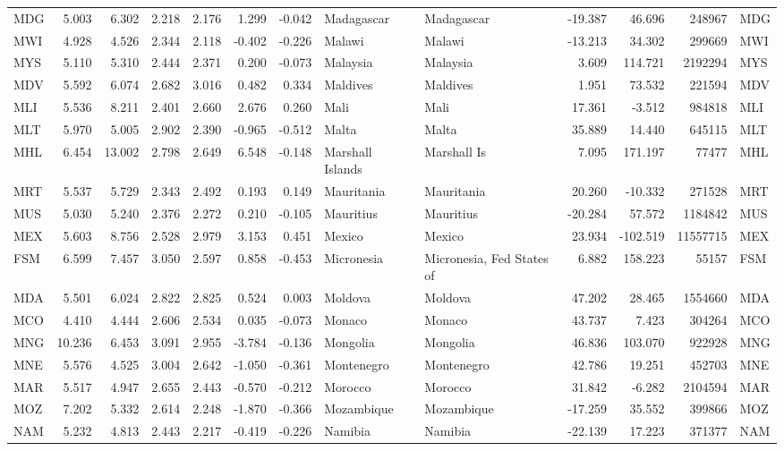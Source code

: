 \begin{tabular}{lrrrrrrllrrrl}
MDG & 5.003 & 6.302 & 2.218 & 2.176 & 1.299 & -0.042 & Madagascar & Madagascar & -19.387 & 46.696 & 248967 & MDG \\
MWI & 4.928 & 4.526 & 2.344 & 2.118 & -0.402 & -0.226 & Malawi & Malawi & -13.213 & 34.302 & 299669 & MWI \\
MYS & 5.110 & 5.310 & 2.444 & 2.371 & 0.200 & -0.073 & Malaysia & Malaysia & 3.609 & 114.721 & 2192294 & MYS \\
MDV & 5.592 & 6.074 & 2.682 & 3.016 & 0.482 & 0.334 & Maldives & Maldives & 1.951 & 73.532 & 221594 & MDV \\
MLI & 5.536 & 8.211 & 2.401 & 2.660 & 2.676 & 0.260 & Mali & Mali & 17.361 & -3.512 & 984818 & MLI \\
MLT & 5.970 & 5.005 & 2.902 & 2.390 & -0.965 & -0.512 & Malta & Malta & 35.889 & 14.440 & 645115 & MLT \\
MHL & 6.454 & 13.002 & 2.798 & 2.649 & 6.548 & -0.148 & Marshall Islands & Marshall Is & 7.095 & 171.197 & 77477 & MHL \\
MRT & 5.537 & 5.729 & 2.343 & 2.492 & 0.193 & 0.149 & Mauritania & Mauritania & 20.260 & -10.332 & 271528 & MRT \\
MUS & 5.030 & 5.240 & 2.376 & 2.272 & 0.210 & -0.105 & Mauritius & Mauritius & -20.284 & 57.572 & 1184842 & MUS \\
MEX & 5.603 & 8.756 & 2.528 & 2.979 & 3.153 & 0.451 & Mexico & Mexico & 23.934 & -102.519 & 11557715 & MEX \\
FSM & 6.599 & 7.457 & 3.050 & 2.597 & 0.858 & -0.453 & Micronesia & Micronesia, Fed States of & 6.882 & 158.223 & 55157 & FSM \\
MDA & 5.501 & 6.024 & 2.822 & 2.825 & 0.524 & 0.003 & Moldova & Moldova & 47.202 & 28.465 & 1554660 & MDA \\
MCO & 4.410 & 4.444 & 2.606 & 2.534 & 0.035 & -0.073 & Monaco & Monaco & 43.737 & 7.423 & 304264 & MCO \\
MNG & 10.236 & 6.453 & 3.091 & 2.955 & -3.784 & -0.136 & Mongolia & Mongolia & 46.836 & 103.070 & 922928 & MNG \\
MNE & 5.576 & 4.525 & 3.004 & 2.642 & -1.050 & -0.361 & Montenegro & Montenegro & 42.786 & 19.251 & 452703 & MNE \\
MAR & 5.517 & 4.947 & 2.655 & 2.443 & -0.570 & -0.212 & Morocco & Morocco & 31.842 & -6.282 & 2104594 & MAR \\
MOZ & 7.202 & 5.332 & 2.614 & 2.248 & -1.870 & -0.366 & Mozambique & Mozambique & -17.259 & 35.552 & 399866 & MOZ \\
NAM & 5.232 & 4.813 & 2.443 & 2.217 & -0.419 & -0.226 & Namibia & Namibia & -22.139 & 17.223 & 371377 & NAM \\

\end{tabular}
